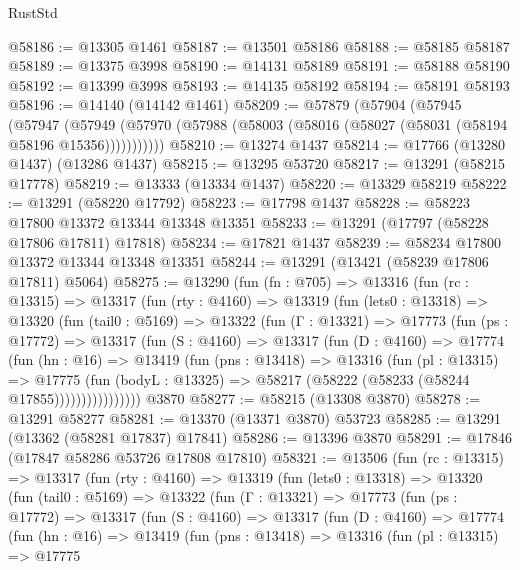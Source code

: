 \begin{lexlean}{RustStd}
\begin{coremodule}
@58186 := @13305 @1461
@58187 := @13501 @58186
@58188 := @58185 @58187
@58189 := @13375 @3998
@58190 := @14131 @58189
@58191 := @58188 @58190
@58192 := @13399 @3998
@58193 := @14135 @58192
@58194 := @58191 @58193
@58196 := @14140 (@14142 @1461)
@58209 := @57879
    (@57904
      (@57945
        (@57947
          (@57949 (@57970 (@57988 (@58003 (@58016 (@58027 (@58031 (@58194 @58196 @15356)))))))))))
@58210 := @13274 @1437
@58214 := @17766 (@13280 @1437) (@13286 @1437)
@58215 := @13295 @53720
@58217 := @13291 (@58215 @17778)
@58219 := @13333 (@13334 @1437)
@58220 := @13329 @58219
@58222 := @13291 (@58220 @17792)
@58223 := @17798 @1437
@58228 := @58223 @17800 @13372 @13344 @13348 @13351
@58233 := @13291 (@17797 (@58228 @17806 @17811) @17818)
@58234 := @17821 @1437
@58239 := @58234 @17800 @13372 @13344 @13348 @13351
@58244 := @13291 (@13421 (@58239 @17806 @17811) @5064)
@58275 := @13290
    (fun (fn : @705) =>
    @13316
      (fun (rc : @13315) =>
      @13317
        (fun (rty : @4160) =>
        @13319
          (fun (lets0 : @13318) =>
          @13320
            (fun (tail0 : @5169) =>
            @13322
              (fun (Γ : @13321) =>
              @17773
                (fun (ps : @17772) =>
                @13317
                  (fun (S : @4160) =>
                  @13317
                    (fun (D : @4160) =>
                    @17774
                      (fun (hn : @16) =>
                      @13419
                        (fun (pns : @13418) =>
                        @13316
                          (fun (pl : @13315) =>
                          @17775
                            (fun (bodyL : @13325) =>
                            @58217 (@58222 (@58233 (@58244 @17855))))))))))))))))
    @3870
@58277 := @58215 (@13308 @3870)
@58278 := @13291 @58277
@58281 := @13370 (@13371 @3870) @53723
@58285 := @13291 (@13362 (@58281 @17837) @17841)
@58286 := @13396 @3870
@58291 := @17846 (@17847 @58286 @53726 @17808 @17810)
@58321 := @13506
    (fun (rc : @13315) =>
    @13317
      (fun (rty : @4160) =>
      @13319
        (fun (lets0 : @13318) =>
        @13320
          (fun (tail0 : @5169) =>
          @13322
            (fun (Γ : @13321) =>
            @17773
              (fun (ps : @17772) =>
              @13317
                (fun (S : @4160) =>
                @13317
                  (fun (D : @4160) =>
                  @17774
                    (fun (hn : @16) =>
                    @13419
                      (fun (pns : @13418) =>
                      @13316
                        (fun (pl : @13315) =>
                        @17775

\end{coremodule}
\end{lexlean}
